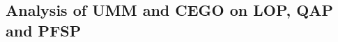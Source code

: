 \documentclass[runningheads]{llncs}
\newcommand{\supplement}{\href{http://doi.org/10.5281/zenodo.4167148}{doi:10.5281/zenodo.4167148}}
\begin{document}

\subsection{Analysis of UMM and CEGO on LOP, QAP and PFSP}
\end{document}
